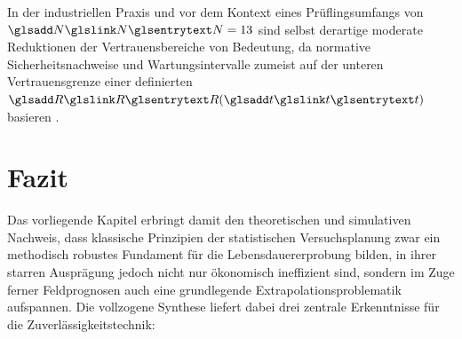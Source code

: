 In der industriellen Praxis und vor dem Kontext eines Prüflingsumfangs von $\sym{N}=13$ sind selbst derartige moderate Reduktionen der Vertrauensbereiche von Bedeutung, da normative Sicherheitsnachweise und Wartungsintervalle zumeist auf der unteren Vertrauensgrenze einer definierten $\sym{R}(\sym{t})$ basieren \cite{Meeker.2022,Bertsche.2022}.


\section{Fazit} \label{sec:chap5_fazit}

Das vorliegende Kapitel erbringt damit den theoretischen und simulativen Nachweis, dass klassische Prinzipien der statistischen Versuchsplanung zwar ein methodisch robustes Fundament für die Lebensdauererprobung bilden, in ihrer starren Ausprägung jedoch nicht nur ökonomisch ineffizient sind, sondern im Zuge ferner Feldprognosen auch eine grundlegende Extrapolationsproblematik aufspannen.
Die vollzogene Synthese liefert dabei drei zentrale Erkenntnisse für die Zuverlässigkeitstechnik:

